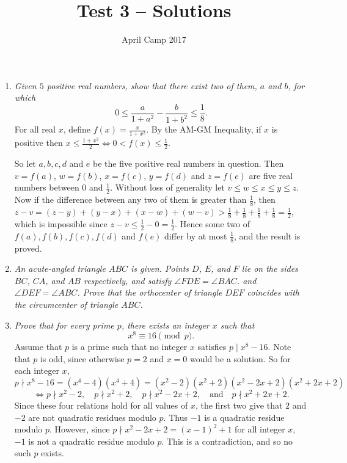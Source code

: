 \documentclass[a4paper,12pt]{article}
\author{April Camp 2017}
\title{Test 3 -- Solutions}
\date{}
\begin{document}
 \maketitle

\begin{enumerate}
	\item 
	\textit{Given $5$ positive real numbers, show that there exist two of them,
	$a$ and $b$, for which \[0 \leq \frac{a}{1+a^2} - \frac{b}{1+b^2} \leq \frac{1}{8}.\]}
	For all real $x$, define $f(x) = \frac{x}{1+x^2}$. By the AM-GM Inequality, if $x$ is positive then $x \leq \frac{1+x^2}{2} \iff 0 < f(x) \leq \frac{1}{2}$.
	
	So let $a,b,c,d$ and $e$ be the five positive real numbers in question. Then $v=f(a)$, $w=f(b)$, $x=f(c)$, $y=f(d)$ and $z=f(e)$ are five real numbers between $0$ and $\frac{1}{2}$. Without loss of generality let $v\leq w\leq x\leq y\leq z$. Now if the difference between any two of them is greater than $\frac{1}{8}$, then $z-v = (z-y) + (y-x) + (x-w) + (w-v) > \frac{1}{8}+\frac{1}{8}+\frac{1}{8}+\frac{1}{8} = \frac{1}{2}$, which is impossible since $z-v \leq \frac{1}{2}-0 = \frac{1}{2}$. Hence some two of $f(a), f(b), f(c), f(d)$ and $f(e)$ differ by at most $\frac{1}{8}$, and the result is proved.
	
	\item 
	\textit{An acute-angled triangle $ABC$ is given. Points $D$, $E$, and $F$ lie
	on the sides $BC$, $CA$, and $AB$ respectively, and satisfy $\angle
	FDE = \angle BAC$. and $\angle DEF = \angle ABC$. Prove that the
	orthocenter of triangle $DEF$ coincides with the circumcenter of
	triangle $ABC$.}
	
	
	
	\item
	\textit{Prove that for every prime $p$, there exists an integer $x$ such that \[x^8 \equiv 16 \pmod p.\]}
	Assume that $p$ is a prime such that no integer $x$ satisfies $p \mid x^8-16$. Note that $p$ is odd, since otherwise $p=2$ and $x=0$ would be a solution. So for each integer $x$, \[p \nmid x^8-16 = (x^4-4)(x^4+4) = (x^2-2)(x^2+2) (x^2-2x+2)(x^2+2x+2)\] \[\iff p \nmid x^2-2,\quad p \nmid x^2+2,\quad p \nmid x^2-2x+2,\quad \text{and} \quad p \nmid x^2+2x+2.\]
	Since these four relations hold for all values of $x$, the first two give that $2$ and $-2$ are not quadratic residues modulo $p$. Thus $-1$ is a quadratic residue modulo $p$. However, since $p \nmid x^2-2x+2 = (x-1)^2+1$ for all integer $x$, $-1$ is not a quadratic residue modulo $p$. This is a contradiction, and so no such $p$ exists.
	

\end{enumerate}
\end{document}
